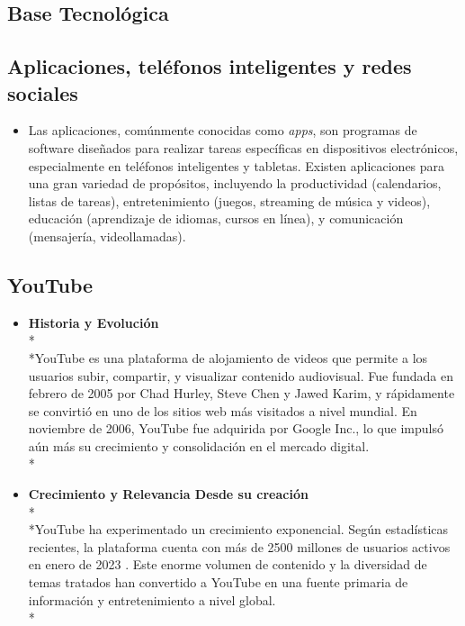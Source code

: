\documentclass[a4paper,12pt,twoside]{memoir}
\begin{document}
\begin{itemize}
\section{Base Tecnológica}
\subsection{Aplicaciones, teléfonos inteligentes y redes sociales}
    \begin{itemize}
        \item Las aplicaciones, comúnmente conocidas como \textit{apps}, son programas de software diseñados para realizar tareas específicas en dispositivos electrónicos, especialmente en teléfonos inteligentes y tabletas. Existen aplicaciones para una gran variedad de propósitos, incluyendo la productividad (calendarios, listas de tareas), entretenimiento (juegos, streaming de música y videos), educación (aprendizaje de idiomas, cursos en línea), y comunicación (mensajería, videollamadas). 
    \end{itemize}
\subsection{YouTube}
    \begin{itemize}
        \item \textbf{Historia y Evolución} \\*\\*YouTube es una plataforma de alojamiento de videos que permite a los usuarios subir, compartir, y visualizar contenido audiovisual. Fue fundada en febrero de 2005 por Chad Hurley, Steve Chen y Jawed Karim, y rápidamente se convirtió en uno de los sitios web más visitados a nivel mundial. En noviembre de 2006, YouTube fue adquirida por Google Inc., lo que impulsó aún más su crecimiento y consolidación en el mercado digital\cite{wikiyoutube}.\\*
        \item \textbf{Crecimiento y Relevancia Desde su creación}\\*\\*YouTube ha experimentado un crecimiento exponencial. Según estadísticas recientes, la plataforma cuenta con más de 2500 millones de usuarios activos en enero de 2023 \cite{statista2024youtube}. Este enorme volumen de contenido y la diversidad de temas tratados han convertido a YouTube en una fuente primaria de información y entretenimiento a nivel global.\\*
    

\end{itemize}
\end{itemize}
\end{document}
